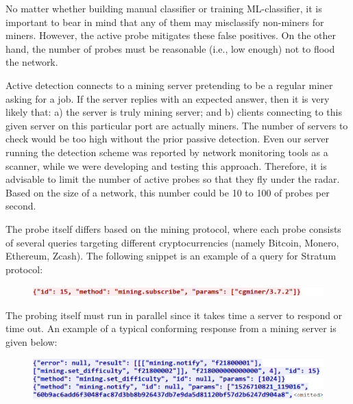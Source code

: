 \documentclass[preprint,12pt,3p]{elsarticle}
\begin{document}
No matter whether building manual classifier or training ML-classifier, it is important to bear in mind that any of them may misclassify non-miners for miners. However, the active probe mitigates these false positives. On the other hand, the number of probes must be reasonable (i.e., low enough) not to flood the network.

Active detection connects to a mining server pretending to be a regular miner asking for a job. 
If the server replies with an expected answer, then it is very likely that: a) the server is truly mining server; and b) clients connecting to this given server on this particular port are actually miners.
The number of servers to check would be too high without the prior passive detection. 
Even our server running the detection scheme was reported by network monitoring tools as a scanner, while we were developing and testing this approach.
Therefore, it is advisable to limit the number of active probes so that they fly under the radar. 
Based on the size of a network, this number could be 10 to 100 of probes per second.

The probe itself differs based on the mining protocol, where each probe consists of several queries targeting different cryptocurrencies (namely Bitcoin, Monero, Ethereum, Zcash).
The following snippet is an example of a query for Stratum protocol:

\begin{figure}[!h]
    \label{fig:tam}
    \centering
    \includegraphics[width=\textwidth]{tam.png}
\end{figure}


The probing itself must run in parallel since it takes time a server to respond or time out. An example of a typical conforming response from a mining server is given below:

\begin{figure}[!h]
    \label{fig:zpet}
    \centering
    \includegraphics[width=\textwidth]{zpet.png}
\end{figure}
\end{document}
